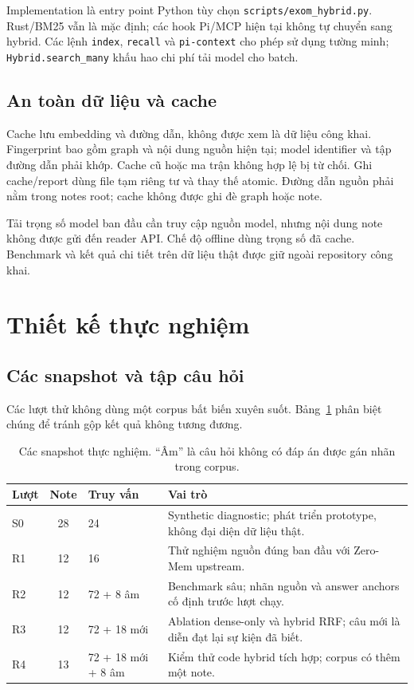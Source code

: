 \documentclass[11pt,a4paper]{article}
\begin{document}
Implementation là entry point Python tùy chọn \texttt{scripts/exom\_hybrid.py}. Rust/BM25 vẫn là mặc định; các hook Pi/MCP hiện tại không tự chuyển sang hybrid. Các lệnh \texttt{index}, \texttt{recall} và \texttt{pi-context} cho phép sử dụng tường minh; \texttt{Hybrid.search\_many} khấu hao chi phí tải model cho batch.

\subsection{An toàn dữ liệu và cache}
Cache lưu embedding và đường dẫn, không được xem là dữ liệu công khai. Fingerprint bao gồm graph và nội dung nguồn hiện tại; model identifier và tập đường dẫn phải khớp. Cache cũ hoặc ma trận không hợp lệ bị từ chối. Ghi cache/report dùng file tạm riêng tư và thay thế atomic. Đường dẫn nguồn phải nằm trong notes root; cache không được ghi đè graph hoặc note.

Tải trọng số model ban đầu cần truy cập nguồn model, nhưng nội dung note không được gửi đến reader API. Chế độ offline dùng trọng số đã cache. Benchmark và kết quả chi tiết trên dữ liệu thật được giữ ngoài repository công khai.

\section{Thiết kế thực nghiệm}
\subsection{Các snapshot và tập câu hỏi}
Các lượt thử không dùng một corpus bất biến xuyên suốt. Bảng~\ref{tab:protocol} phân biệt chúng để tránh gộp kết quả không tương đương.
\begin{table}[ht]
\centering\small
\begin{tabularx}{\linewidth}{@{}lclX@{}}
\toprule
Lượt & Note & Truy vấn & Vai trò \\
\midrule
S0 & 28 & 24 & Synthetic diagnostic; phát triển prototype, không đại diện dữ liệu thật. \\
R1 & 12 & 16 & Thử nghiệm nguồn đúng ban đầu với Zero-Mem upstream. \\
R2 & 12 & 72 + 8 âm & Benchmark sâu; nhãn nguồn và answer anchors cố định trước lượt chạy. \\
R3 & 12 & 72 + 18 mới & Ablation dense-only và hybrid RRF; câu mới là diễn đạt lại sự kiện đã biết. \\
R4 & 13 & 72 + 18 mới + 8 âm & Kiểm thử code hybrid tích hợp; corpus có thêm một note. \\
\bottomrule
\end{tabularx}
\caption{Các snapshot thực nghiệm. ``Âm'' là câu hỏi không có đáp án được gán nhãn trong corpus.}\label{tab:protocol}
\end{table}
\end{document}
